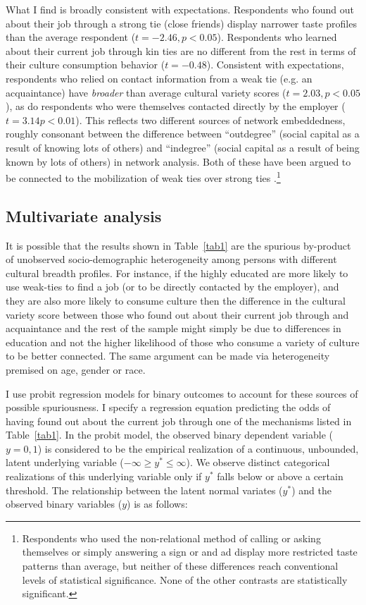 \documentclass[12pt]{article}
\begin{document}
What I find is broadly consistent with expectations.  Respondents who found out about their job through a strong tie (close friends) display narrower taste profiles than the average respondent ($t=-2.46, p<0.05$).  Respondents who learned about their current job through kin ties are no different from the rest in terms of their culture consumption behavior ($t=-0.48$).   Consistent with expectations,  respondents who relied on contact information from a weak tie (e.g. an acquaintance) have \emph{broader} than average cultural variety scores ($t=2.03, p<0.05$), as do respondents who were themselves contacted directly by the employer ($t=3.14 p<0.01$).   This reflects two different sources of network embeddedness, roughly consonant between the difference between ``outdegree'' (social capital as a result of knowing lots of others) and ``indegree'' (social capital as a result of being known by lots of others) in network analysis.  Both of these have been argued to be connected to the mobilization of weak ties over strong ties \citep{granovetter95, yakubovich05}.\footnote{Respondents who used the non-relational method of calling or asking themselves or simply answering a sign or and ad display more restricted taste patterns than average, but neither of these differences reach conventional levels of statistical significance.  None of the other contrasts are statistically significant. }   

\subsection{Multivariate analysis}
It is possible that the results shown in Table~\ref{tab1} are the spurious by-product of unobserved socio-demographic heterogeneity among persons with different cultural breadth profiles.  For instance, if the highly educated are more likely to use weak-ties to find a job (or to be directly contacted by the employer), and they are also more likely to consume culture then the difference in the cultural variety score between those who found out about their current job through and acquaintance and the rest of the sample might simply be due to differences in education and not the higher likelihood of those who consume a variety of culture to be better connected.  The same argument can be made via heterogeneity premised on age, gender or race.  

I use probit regression models for binary outcomes to account for these sources of possible spuriousness.  I specify a regression equation predicting the odds of having found out about the current job through one of the mechanisms listed in Table~\ref{tab1}.  In the probit model, the observed binary dependent variable ($y=0,1$) is considered to be the empirical realization of a continuous, unbounded, latent underlying variable ($-\infty \geq y^{*} \leq \infty$).  We observe distinct categorical realizations of this underlying variable only if $y^{*}$ falls below or above a certain threshold.  The relationship between the latent normal variates ($y^{*}$) and the observed binary variables ($y$) is as follows:
\end{document}
